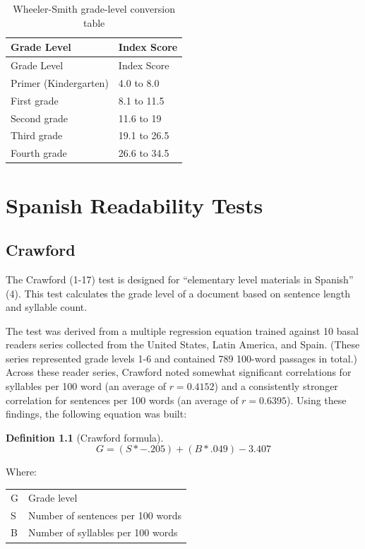 \documentclass[
]{book}
\theoremstyle{definition}
\newtheorem{definition}{Definition}[chapter]
\theoremstyle{definition}
\theoremstyle{definition}
\theoremstyle{definition}
\theoremstyle{remark}
\begin{document}
\begin{longtable}[]{@{}ll@{}}
\caption{Wheeler-Smith grade-level conversion table}\tabularnewline
\toprule
Grade Level & Index Score \\
\midrule
\endfirsthead
\toprule
Grade Level & Index Score \\
\midrule
\endhead
Primer (Kindergarten) & 4.0 to 8.0 \\
First grade & 8.1 to 11.5 \\
Second grade & 11.6 to 19 \\
Third grade & 19.1 to 26.5 \\
Fourth grade & 26.6 to 34.5 \\
\bottomrule
\end{longtable}

\hypertarget{spanish-readability-tests}{%
\chapter{Spanish Readability Tests}\label{spanish-readability-tests}}

\hypertarget{crawford}{%
\section{\texorpdfstring{Crawford}{Crawford}}\label{crawford}}

The Crawford (1-17) test is designed for ``elementary level materials in Spanish'' (4). This test calculates the grade level of a document based on sentence length and syllable count.

The test was derived from a multiple regression equation trained against 10 basal readers series collected from the United States, Latin America, and Spain. (These series represented grade levels 1-6 and contained 789 100-word passages in total.) Across these reader series, Crawford noted somewhat significant correlations for syllables per 100 word (an average of \(r = 0.4152\)) and a consistently stronger correlation for sentences per 100 words (an average of \(r = 0.6395\)). Using these findings, the following equation was built:

\begin{definition}[Crawford formula]
\protect\hypertarget{def:crawford}{}{\label{def:crawford} {} }\[
G = (S*-.205) + (B*.049) - 3.407
\]
\end{definition}

Where:

\begin{longtable}[]{@{}
  >{\raggedright\arraybackslash}p{}
  >{\raggedright\arraybackslash}p{}@{}}
\toprule
\endhead
G & Grade level \\
S & Number of sentences per 100 words \\
B & Number of syllables per 100 words \\
\bottomrule
\end{longtable}
\end{document}
